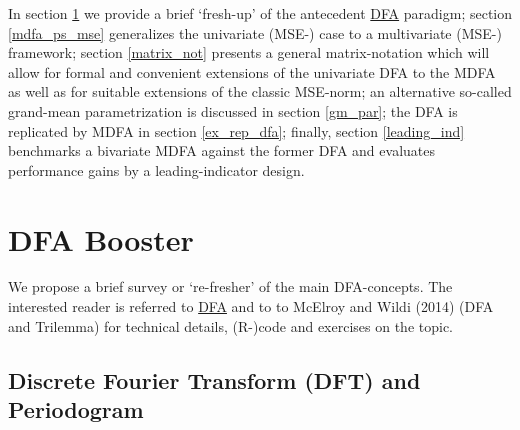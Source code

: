 \documentclass[a4paper]{book}
\begin{document}
In section \ref{fresh_up} we provide a brief `fresh-up' of the antecedent \href{http://blog.zhaw.ch/sef/files/2014/10/DFA.pdf}{DFA} paradigm; section \ref{mdfa_ps_mse} generalizes the univariate (MSE-) case to a multivariate (MSE-) framework; section \ref{matrix_not} presents a general matrix-notation which will allow for formal and convenient extensions of the univariate DFA to the MDFA as well as for suitable extensions of the classic MSE-norm; an alternative so-called grand-mean parametrization is discussed in section \ref{gm_par}; the DFA is replicated by MDFA in section \ref{ex_rep_dfa}; finally, section \ref{leading_ind} benchmarks a bivariate MDFA against the former DFA and evaluates performance gains by a leading-indicator design.

\section{DFA Booster}\label{fresh_up}

We propose a brief survey or `re-fresher' of the main DFA-concepts. The interested reader is referred  to \href{http://blog.zhaw.ch/sef/files/2014/10/DFA.pdf}{DFA} and to to McElroy and Wildi (2014) (DFA and Trilemma) for technical details, (R-)code and exercises on the topic.



\subsection{Discrete Fourier Transform (DFT) and Periodogram}\label{dft_and_per}
\end{document}
